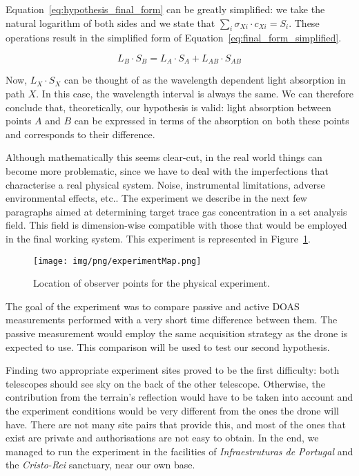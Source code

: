 Equation~\ref{eq:hypothesis_final_form} can be greatly simplified: we
take the natural logarithm of both sides and we state that $\sum_i
\sigma_{Xi} \cdot c_{Xi} = S_i$. These operations result in the
simplified form of Equation~\ref{eq:final_form_simplified}.

\begin{equation}
    \label{eq:final_form_simplified}
    L_B \cdot S_B = L_A \cdot S_A + L_{AB} \cdot S_{AB}
\end{equation}

Now, $L_X \cdot S_X$ can be thought of as the wavelength dependent light
absorption in path $X$. In this case, the wavelength interval is always
the same. We can therefore conclude that, theoretically, our
hypothesis is valid: light absorption between points $A$ and $B$ can be
expressed in terms of the absorption on both these points and
corresponds to their difference.

Although mathematically this seems clear-cut, in the real world things
can become more problematic, since we have to deal with the
imperfections that characterise a real physical system. Noise,
instrumental limitations, adverse environmental effects, etc.. The
experiment we describe in the next few paragraphs aimed at determining
target trace gas concentration in a set analysis field. This field is
dimension-wise compatible with those that would be employed in the final
working system. This experiment is represented in
Figure~\ref{fig:experiment_map}.

\begin{figure}[htpb]
    \centering
    \texttt{[image: img/png/experimentMap.png]}
    \caption{Location of observer points for the physical experiment.}
    \label{fig:experiment_map}
\end{figure}

The goal of the experiment was to compare passive and active \gls{DOAS}
measurements performed with a very short time difference between them.
The passive measurement would employ the same acquisition strategy as
the drone is expected to use. This comparison will be used to test our
second hypothesis.

Finding two appropriate experiment sites proved to be the first
difficulty: both telescopes should see sky on the back of the other
telescope. Otherwise, the contribution from the terrain's reflection
would have to be taken into account and the experiment conditions would
be very different from the ones the drone will have. There are not many
site pairs that provide this, and most of the ones that exist are
private and authorisations are not easy to obtain. In the end, we
managed to run the experiment in the facilities of \emph{Infraestruturas
de Portugal} and the \emph{Cristo-Rei} sanctuary, near our own base. 

